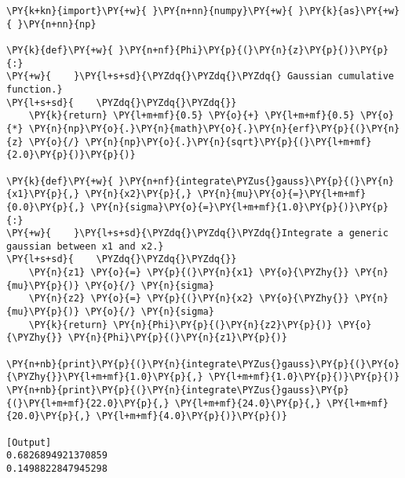 \begin{Verbatim}[label=\makebox{\href{https://github.com/unipi-physics-labs/statnotes/tree/main/snippy/erf.py}{https://github.com/.../erf.py}},commandchars=\\\{\}]
\PY{k+kn}{import}\PY{+w}{ }\PY{n+nn}{numpy}\PY{+w}{ }\PY{k}{as}\PY{+w}{ }\PY{n+nn}{np}

\PY{k}{def}\PY{+w}{ }\PY{n+nf}{Phi}\PY{p}{(}\PY{n}{z}\PY{p}{)}\PY{p}{:}
\PY{+w}{    }\PY{l+s+sd}{\PYZdq{}\PYZdq{}\PYZdq{} Gaussian cumulative function.}
\PY{l+s+sd}{    \PYZdq{}\PYZdq{}\PYZdq{}}
    \PY{k}{return} \PY{l+m+mf}{0.5} \PY{o}{+} \PY{l+m+mf}{0.5} \PY{o}{*} \PY{n}{np}\PY{o}{.}\PY{n}{math}\PY{o}{.}\PY{n}{erf}\PY{p}{(}\PY{n}{z} \PY{o}{/} \PY{n}{np}\PY{o}{.}\PY{n}{sqrt}\PY{p}{(}\PY{l+m+mf}{2.0}\PY{p}{)}\PY{p}{)}

\PY{k}{def}\PY{+w}{ }\PY{n+nf}{integrate\PYZus{}gauss}\PY{p}{(}\PY{n}{x1}\PY{p}{,} \PY{n}{x2}\PY{p}{,} \PY{n}{mu}\PY{o}{=}\PY{l+m+mf}{0.0}\PY{p}{,} \PY{n}{sigma}\PY{o}{=}\PY{l+m+mf}{1.0}\PY{p}{)}\PY{p}{:}
\PY{+w}{    }\PY{l+s+sd}{\PYZdq{}\PYZdq{}\PYZdq{}Integrate a generic gaussian between x1 and x2.}
\PY{l+s+sd}{    \PYZdq{}\PYZdq{}\PYZdq{}}
    \PY{n}{z1} \PY{o}{=} \PY{p}{(}\PY{n}{x1} \PY{o}{\PYZhy{}} \PY{n}{mu}\PY{p}{)} \PY{o}{/} \PY{n}{sigma}
    \PY{n}{z2} \PY{o}{=} \PY{p}{(}\PY{n}{x2} \PY{o}{\PYZhy{}} \PY{n}{mu}\PY{p}{)} \PY{o}{/} \PY{n}{sigma}
    \PY{k}{return} \PY{n}{Phi}\PY{p}{(}\PY{n}{z2}\PY{p}{)} \PY{o}{\PYZhy{}} \PY{n}{Phi}\PY{p}{(}\PY{n}{z1}\PY{p}{)}

\PY{n+nb}{print}\PY{p}{(}\PY{n}{integrate\PYZus{}gauss}\PY{p}{(}\PY{o}{\PYZhy{}}\PY{l+m+mf}{1.0}\PY{p}{,} \PY{l+m+mf}{1.0}\PY{p}{)}\PY{p}{)}
\PY{n+nb}{print}\PY{p}{(}\PY{n}{integrate\PYZus{}gauss}\PY{p}{(}\PY{l+m+mf}{22.0}\PY{p}{,} \PY{l+m+mf}{24.0}\PY{p}{,} \PY{l+m+mf}{20.0}\PY{p}{,} \PY{l+m+mf}{4.0}\PY{p}{)}\PY{p}{)}

[Output]
0.6826894921370859
0.1498822847945298
\end{Verbatim}
